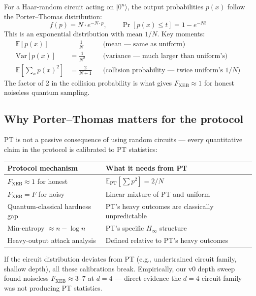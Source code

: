 \documentclass[11pt,a4paper]{article}
\theoremstyle{plain}
\theoremstyle{definition}
\theoremstyle{remark}
\newcommand{\Hmin}{H_{\infty}}
\newcommand{\E}{\mathbb{E}}
\renewcommand{\Pr}{\operatorname{Pr}}
\begin{document}
For a Haar-random circuit acting on $|0^n\rangle$, the output probabilities $p(x)$ follow the Porter--Thomas distribution:
\begin{equation}
f(p) = N \cdot e^{-N \cdot p}, \qquad \Pr[p(x) \leq t] = 1 - e^{-N t}
\label{eq:pt}
\end{equation}
This is an exponential distribution with mean $1/N$. Key moments:
\begin{align}
\E[p(x)] &= \frac{1}{N} && \text{(mean --- same as uniform)} \\
\mathrm{Var}[p(x)] &= \frac{1}{N^2} && \text{(variance --- much larger than uniform's)} \\
\E\!\left[\sum_x p(x)^2\right] &= \frac{2}{N+1} && \text{(collision probability --- twice uniform's $1/N$)}
\end{align}
The factor of 2 in the collision probability is what gives $F_{\mathrm{XEB}} \approx 1$ for honest noiseless quantum sampling.

\subsection{Why Porter--Thomas matters for the protocol}

PT is not a passive consequence of using random circuits --- every quantitative claim in the protocol is calibrated to PT statistics:

\begin{center}
\small
\begin{tabular}{@{}p{5cm}p{8cm}@{}}
\toprule
\textbf{Protocol mechanism} & \textbf{What it needs from PT} \\
\midrule
$F_{\mathrm{XEB}} \approx 1$ for honest & $\E_{\mathrm{PT}}[\sum p^2] = 2/N$ \\
$F_{\mathrm{XEB}} = F$ for noisy & Linear mixture of PT and uniform \\
Quantum-classical hardness gap & PT's heavy outcomes are classically unpredictable \\
Min-entropy $\approx n - \log n$ & PT's specific $\Hmin$ structure \\
Heavy-output attack analysis & Defined relative to PT's heavy outcomes \\
\bottomrule
\end{tabular}
\end{center}

If the circuit distribution deviates from PT (e.g., undertrained circuit family, shallow depth), all these calibrations break. Empirically, our v0 depth sweep found noiseless $F_{\mathrm{XEB}} \approx 3$--$7$ at $d=4$ --- direct evidence the $d=4$ circuit family was not producing PT statistics.
\end{document}
